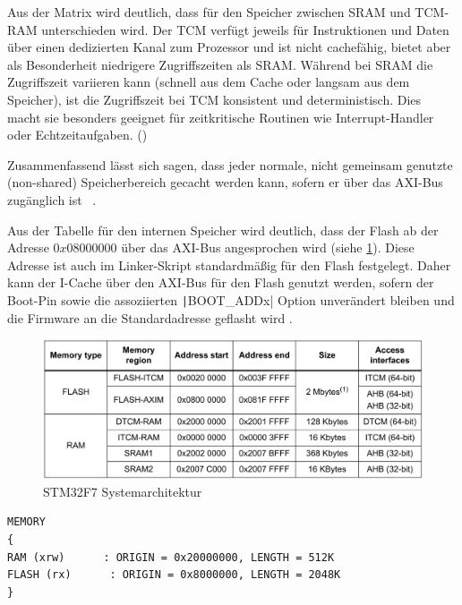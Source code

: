Aus der Matrix wird deutlich, dass für den Speicher zwischen SRAM und TCM-RAM
unterschieden wird. Der \ac{TCM} verfügt jeweils für Instruktionen und Daten
über einen dedizierten Kanal zum Prozessor und ist nicht cachefähig, bietet aber
als Besonderheit niedrigere Zugriffszeiten als SRAM. Während bei SRAM die
Zugriffszeit variieren kann (schnell aus dem Cache oder langsam aus dem
Speicher), ist die Zugriffszeit bei TCM konsistent und deterministisch. Dies
macht sie besonders geeignet für zeitkritische Routinen wie Interrupt-Handler
oder Echtzeitaufgaben. (\cite{arm_den0042})

Zusammenfassend lässt sich sagen, dass jeder normale, nicht gemeinsam genutzte
(non-shared) Speicherbereich gecacht werden kann, sofern er über das AXI-Bus
zugänglich ist \cite[S. 4]{an4839}~\cite[S. 7]{an4667}.

Aus der Tabelle für den internen Speicher wird deutlich, dass der Flash ab der
Adresse $0x0800 0000$ über das AXI-Bus angesprochen wird (siehe
\ref{fig:internal_mem_table}). Diese Adresse ist auch im Linker-Skript
standardmäßig für den Flash festgelegt. Daher kann der I-Cache über den AXI-Bus
für den Flash genutzt werden, sofern der Boot-Pin sowie die assoziierten
\texttt|BOOT_ADDx| Option unverändert bleiben und die Firmware an die
Standardadresse geflasht wird \cite[S. 28]{stm32_datasheet}.

\begin{figure}[htb]
    \centering
    \includegraphics[width=1\textwidth]{assets/internal_mem_table}
    \caption{STM32F7 Systemarchitektur \cite[S. 14]{an4667}}
    \label{fig:internal_mem_table}
\end{figure}

\begin{code}
\begin{verbatim}
MEMORY
{
RAM (xrw)      : ORIGIN = 0x20000000, LENGTH = 512K
FLASH (rx)      : ORIGIN = 0x8000000, LENGTH = 2048K
}
\end{verbatim}
\end{code}

